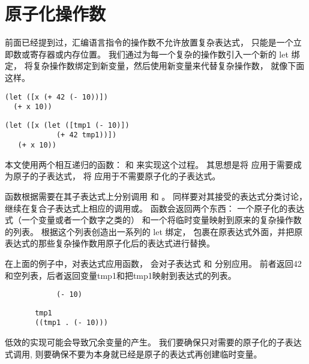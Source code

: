 
\section{原子化操作数}

前面已经提到过，汇编语言指令的操作数不允许放置复杂表达式，
只能是一个立即数或寄存器或内存位置。
我们通过为每一个复杂的操作数引入一个新的 let 绑定，
将复杂操作数绑定到新变量，然后使用新变量来代替复杂操作数，
就像下面这样。

\begin{transformation}
\begin{lstlisting}
(let ([x (+ 42 (- 10))])
  (+ x 10))
\end{lstlisting}
\compilesto
\begin{lstlisting}
(let ([x (let ([tmp1 (- 10)])
            (+ 42 tmp1))])
   (+ x 10))
\end{lstlisting}
\end{transformation}

本文使用两个相互递归的函数： 和  来实现这个过程。
其思想是将  应用于需要成为原子的子表达式，
将  应用于不需要原子化的子表达式。

 函数根据需要在其子表达式上分别调用
 和 。
同样要对其接受的表达式分类讨论，
继续在复合子表达式上相应的调用或。
 函数会返回两个东西：
一个原子化的表达式（一个变量或者一个数字之类的）
和一个将临时变量映射到原来的复杂操作数的列表。
 根据这个列表创造出一系列的 let 绑定，
包裹在原表达式外面，并把原表达式的那些复杂操作数用原子化后的表达式进行替换。

在上面的例子中，对表达式应用函数，
会对子表达式  和  分别应用。
前者返回42和空列表，后者返回变量tmp1和把tmp1映射到表达式的列表。

\begin{transformation}
\begin{lstlisting}
            (- 10)
\end{lstlisting}
\compilesto
\begin{lstlisting}
       tmp1
       ((tmp1 . (- 10)))
\end{lstlisting}
\end{transformation}

低效的实现可能会导致冗余变量的产生。
我们要确保只对需要的原子化的子表达式调用,
则要确保不要为本身就已经是原子的表达式再创建临时变量。

